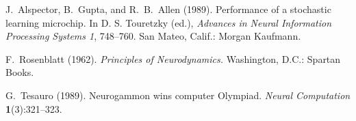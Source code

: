 \documentclass[twoside]{article}
\begin{document}


\begin{thebibliography}{}
\setlength{\itemindent}{-\leftmargin}
\makeatletter\renewcommand{\@biblabel}[1]{}\makeatother
\bibitem{} J.~Alspector, B.~Gupta, and R.~B.~Allen (1989).
    \newblock Performance of a stochastic learning microchip.
    \newblock In D. S. Touretzky (ed.),
    \textit{Advances in Neural Information Processing Systems 1}, 748--760.
    San Mateo, Calif.: Morgan Kaufmann.

\bibitem{} F.~Rosenblatt (1962).
    \newblock \textit{Principles of Neurodynamics.}
    \newblock Washington, D.C.: Spartan Books.

\bibitem{} G.~Tesauro (1989).
    \newblock Neurogammon wins computer Olympiad.
    \newblock \textit{Neural Computation} \textbf{1}(3):321--323.
\end{thebibliography}
\end{document}
